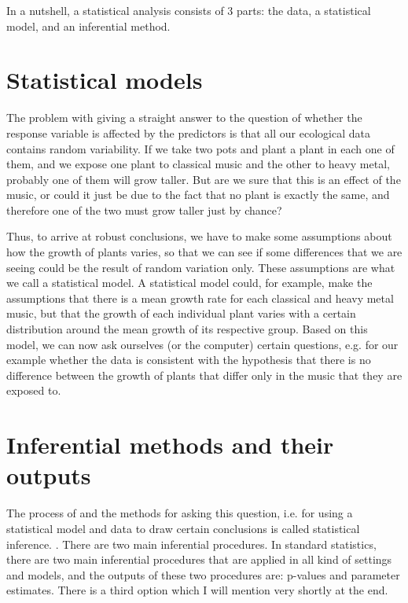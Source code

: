 \documentclass[a4paper,twoside]{tufte-book} %
\begin{document}
In a nutshell, a statistical analysis consists of 3 parts: the data, a statistical model, and an inferential method. 



\section{Statistical models}

The problem with giving a straight answer to the question of whether the response variable is affected by the predictors is that all our ecological data contains random variability. If we take two pots and plant a plant in each one of them, and we expose one plant to classical music and the other to heavy metal, probably one of them will grow taller. But are we sure that this is an effect of the music, or could it just be due to the fact that no plant is exactly the same, and therefore one of the two must grow taller just by chance?

Thus, to arrive at robust conclusions, we have to make some assumptions about how the growth of plants varies, so that we can see if some differences that we are seeing could be the result of random variation only. These assumptions are what we call a statistical model.  A statistical model could, for example, make the assumptions that there is a mean growth rate for each classical and heavy metal music, but that the growth of each individual plant varies with a certain distribution around the mean growth of its respective group. Based on this model, we can now ask ourselves (or the computer) certain questions, e.g. for our example whether the data is consistent with the hypothesis that there is no difference between the growth of plants that differ only in the music that they are exposed to.


\section{Inferential methods and their outputs}

The process of and the methods for asking this question, i.e. for using a statistical model and data to draw certain conclusions is called statistical inference. . There are two main inferential procedures. In standard statistics, there are two main inferential procedures that are applied in all kind of settings and models, and the outputs of these two procedures are: p-values and parameter estimates. There is a third option which I will mention very shortly at the end.  
\end{document}
